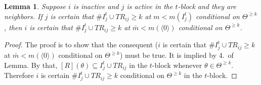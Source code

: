 \documentclass[12pt,letter]{article}
\newtheorem{lemma}{Lemma}[section]
\theoremstyle{definition}
\theoremstyle{definition}
\theoremstyle{remark}
\theoremstyle{claim}
\begin{document}
\begin{lemma} Suppose $i$ is inactive and $j$ is active in the $t$-block and they are neighbors. If $j$ is certain that $\#I^{t}_j\cup TR_{ij}\geq k$ at $m<m(I^t_j)$ conditional on $\Theta^{\geq k}$, then $i$ is certain that $\#I^{t}_j\cup TR_{ij}\geq k$ at $\bar{m}<m(\langle 0 \rangle)$ conditional on $\Theta^{\geq k}$.
\end{lemma}
\begin{proof}
The proof is to show that the consequent ($i$ is certain that $\#I^{t}_j\cup TR_{ij}\geq k$ at $\bar{m}<m(\langle 0 \rangle)$ conditional on $\Theta^{\geq k}$) must be true. It is implied by 4.~of Lemma. By that, $[R](\theta)\subseteq I^t_j\cup TR_{ij}$ in the $t$-block whenever $\theta\in \Theta^{\geq k}$. Therefore $i$ is certain $\#I^{t}_j\cup TR_{ij}\geq k$ conditional on $\Theta^{\geq k}$ in the $t$-block. 
\end{proof}
\end{document}
